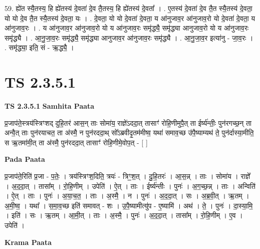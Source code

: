 \documentclass[17pt]{extarticle}
\begin{document}
59. ह्ये॑त स्यै॒तस्य॒ हि ह्ये॑तस्य॑ दे॒वता॑ दे॒व तै॒तस्य॒ हि ह्ये॑तस्य॑ दे॒वता᳚ । . ए॒तस्य॑ दे॒वता॑ दे॒व तै॒त स्यै॒तस्य॑ दे॒वता॒ यो यो दे॒व तै॒त स्यै॒तस्य॑ दे॒वता॒ यः । . दे॒वता॒ यो यो दे॒वता॑ दे॒वता॒ य आ॑नुजाव॒र आ॑नुजाव॒रो यो दे॒वता॑ दे॒वता॒ य आ॑नुजाव॒रः । . य आ॑नुजाव॒र आ॑नुजाव॒रो यो य आ॑नुजाव॒रः समृ॑द्ध्यै॒ समृ॑द्ध्या आनुजाव॒रो यो य आ॑नुजाव॒रः समृ॑द्ध्यै । . आ॒नु॒जा॒व॒रः समृ॑द्ध्यै॒ समृ॑द्ध्या आनुजाव॒र आ॑नुजाव॒रः समृ॑द्ध्यै । . आ॒नु॒जा॒व॒र इत्या॑नु - जा॒व॒रः । . समृ॑द्ध्या॒ इति॒ सं - ऋ॒द्ध्यै॒ । \newline
\pagebreak
{}
\section*{ TS 2.3.5.1 }

\textbf{TS 2.3.5.1 } \newline
\textbf{Samhita Paata} \newline

प्र॒जाप॑ते॒स्त्रय॑स्त्रिꣳशद् दुहि॒तर॑ आस॒न् ताः सोमा॑य॒ राज्ञे॑ऽददा॒त् तासाꣳ॑ रोहि॒णीमुपै॒त् ता ईर्ष्य॑न्तीः॒ पुन॑रगच्छ॒न् ता अन्वै॒त् ताः पुन॑रयाचत॒ ता अ॑स्मै॒ न पुन॑रददा॒थ् सो᳚ऽब्रवीदृ॒तम॑मीष्व॒ यथा॑ समाव॒च्छ उ॑पै॒ष्याम्यथ॑ ते॒ पुन॑र्दास्या॒मीति॒ स ऋ॒तमा॑मी॒त् ता अ॑स्मै॒ पुन॑रददा॒त् तासाꣳ॑ रोहि॒णीमे॒वोप॒त् - [  ] \newline

\textbf{Pada Paata} \newline

प्र॒जाप॑ते॒रिति॑ प्र॒जा - प॒तेः॒ । त्रय॑स्त्रिꣳश॒दिति॒ त्रयः॑ - त्रिꣳ॒॒श॒त् । दु॒हि॒तरः॑ । आ॒स॒न्न् । ताः । सोमा॑य । राज्ञे᳚ । अ॒द॒दा॒त् । तासा᳚म् । रो॒हि॒णीम् । उपेति॑ । ऐ॒त् । ताः । ईर्ष्य॑न्तीः । पुनः॑ । अ॒ग॒च्छ॒न्न् । ताः । अन्विति॑ । ऐ॒त् । ताः । पुनः॑ । अ॒या॒च॒त॒ । ताः । अ॒स्मै॒ । न । पुनः॑ । अ॒द॒दा॒त् । सः । अ॒ब्र॒वी॒त् । ऋ॒तम् । अ॒मी॒ष्व॒ । यथा᳚ । स॒मा॒व॒च्छ इति॑ समावत् - शः । उ॒पै॒ष्यामीत्यु॑प - ए॒ष्यामि॑ । अथ॑ । ते॒ । पुनः॑ । दा॒स्या॒मि॒ । इति॑ । सः । ऋ॒तम् । आ॒मी॒त् । ताः । अ॒स्मै॒ । पुनः॑ । अ॒द॒दा॒त् । तासा᳚म् । रो॒हि॒णीम् । ए॒व । उपेति॑ ।  \newline


\textbf{Krama Paata} \newline
\end{document}
